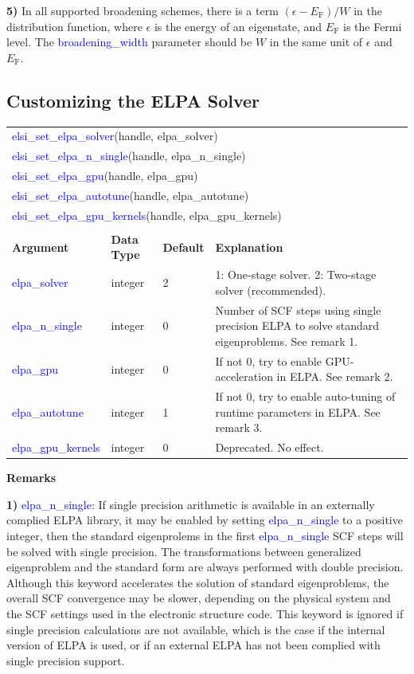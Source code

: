 \documentclass{report}
\newcommand{\tcb}[1]{\textcolor{blue}{#1}}
\begin{document}
\textbf{5)} In all supported broadening schemes, there is a term $(\epsilon - E_\text{F})/W$ in the distribution function, where $\epsilon$ is the energy of an eigenstate, and $E_\text{F}$ is the Fermi level. The \tcb{broadening\_width} parameter should be $W$ in the same unit of $\epsilon$ and $E_\text{F}$.

\subsection{Customizing the ELPA Solver}
\label{subsec:setter_elpa}
\begin{tabular}[]{|p{30mm}|p{20mm}|p{15mm}|p{100mm}|}
\multicolumn{4}{l}{\tcb{elsi\_set\_elpa\_solver}(handle, elpa\_solver)}\\
\multicolumn{4}{l}{\tcb{elsi\_set\_elpa\_n\_single}(handle, elpa\_n\_single)}\\
\multicolumn{4}{l}{\tcb{elsi\_set\_elpa\_gpu}(handle, elpa\_gpu)}\\
\multicolumn{4}{l}{\tcb{elsi\_set\_elpa\_autotune}(handle, elpa\_autotune)}\\
\multicolumn{4}{l}{\tcb{elsi\_set\_elpa\_gpu\_kernels}(handle, elpa\_gpu\_kernels)}\\
\multicolumn{4}{l}{}\\
\hline
\multicolumn{1}{|l|}{\textbf{Argument}} & \multicolumn{1}{l|}{\textbf{Data Type}} & \multicolumn{1}{l|}{\textbf{Default}} & \multicolumn{1}{l|}{\textbf{Explanation}}\\
\hline
\tcb{elpa\_solver}       & integer & 2 & 1: One-stage solver. 2: Two-stage solver (recommended).\\
\hline
\tcb{elpa\_n\_single}    & integer & 0 & Number of SCF steps using single precision ELPA to solve standard eigenproblems. See remark 1.\\
\hline
\tcb{elpa\_gpu}          & integer & 0 & If not 0, try to enable GPU-acceleration in ELPA. See remark 2.\\
\hline
\tcb{elpa\_autotune}     & integer & 1 & If not 0, try to enable auto-tuning of runtime parameters in ELPA. See remark 3.\\
\hline
\tcb{elpa\_gpu\_kernels} & integer & 0 & Deprecated. No effect.\\
\hline
\end{tabular}

\textbf{Remarks}

\textbf{1)} \tcb{elpa\_n\_single}: If single precision arithmetic is available in an externally complied ELPA library, it may be enabled by setting \tcb{elpa\_n\_single} to a positive integer, then the standard eigenprolems in the first \tcb{elpa\_n\_single} SCF steps will be solved with single precision. The transformations between generalized eigenproblem and the standard form are always performed with double precision. Although this keyword accelerates the solution of standard eigenproblems, the overall SCF convergence may be slower, depending on the physical system and the SCF settings used in the electronic structure code. This keyword is ignored if single precision calculations are not available, which is the case if the internal version of ELPA is used, or if an external ELPA has not been complied with single precision support.
\end{document}

